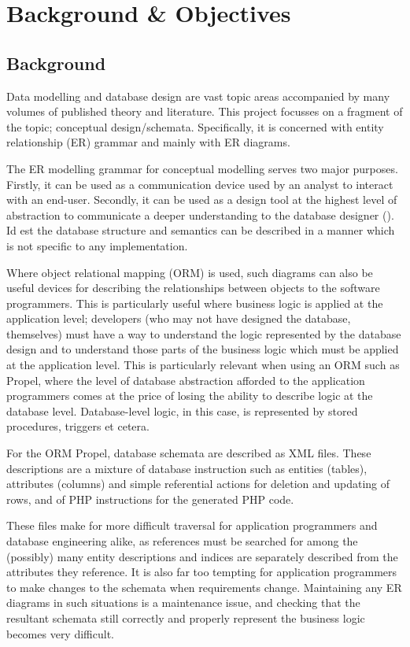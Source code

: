 \cleardoublepage
\chapter{Background \& Objectives} %
\section{Background}
Data modelling and database design are vast topic areas accompanied by many volumes of published theory and literature. This project focusses on a fragment of the topic; conceptual design\slash schemata. Specifically, it is concerned with entity relationship (ER) grammar and mainly with ER diagrams.

The ER modelling grammar for conceptual modelling serves two major purposes. Firstly, it can be used as a communication device used by an analyst to interact with an end-user. Secondly, it can be used as a design tool at the highest level of abstraction to communicate a deeper understanding to the database designer (\cite{DataModelingAndDatabaseDesign}). Id est the database structure and semantics can be described in a manner which is not specific to any implementation.

Where object relational mapping (ORM) is used, such diagrams can also be useful devices for describing the relationships between objects to the software programmers. This is particularly useful where business logic is applied at the application level; developers (who may not have designed the database, themselves) must have a way to understand the logic represented by the database design and to understand those parts of the business logic which must be applied at the application level. This is particularly relevant when using an ORM such as Propel, where the level of database abstraction afforded to the application programmers comes at the price of losing the ability to describe logic at the database level. Database-level logic, in this case, is represented by stored procedures, triggers et cetera.

For the ORM Propel, database schemata are described as XML files. These descriptions are a mixture of database instruction such as entities (tables), attributes (columns) and simple referential actions for deletion and updating of rows, and of PHP instructions for the generated PHP code.

These files make for more difficult traversal for application programmers and database engineering alike, as references must be searched for among the (possibly) many entity descriptions and indices are separately described from the attributes they reference. It is also far too tempting for application programmers to make changes to the schemata when requirements change. Maintaining any ER diagrams in such situations is a maintenance issue, and checking that the resultant schemata still correctly and properly represent the business logic becomes very difficult.

